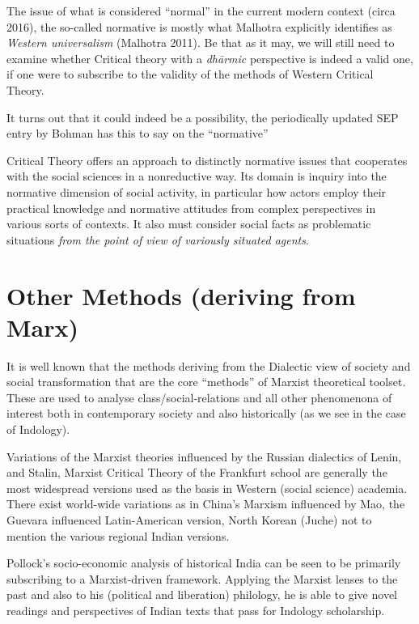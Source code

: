 The issue of what is considered ``normal'' in the current modern context (circa 2016), the so-called normative is mostly what Malhotra explicitly identifies as {\sl Western universalism} (Malhotra 2011). Be that as it may, we will still need to examine whether Critical theory with a {\sl dhārmic} perspective is indeed a valid one, if one were to subscribe to the validity of the methods of Western Critical Theory.

It turns out that it could indeed be a possibility, the periodically updated SEP entry by Bohman has this to say on the ``normative''
\begin{myquote}
Critical Theory offers an approach to distinctly normative issues that cooperates with the social sciences in a nonreductive way. Its domain is inquiry into the normative dimension of social activity, in particular how actors employ their practical knowledge and normative attitudes from complex perspectives in various sorts of contexts. It also must consider social facts as problematic situations {{\sl from the point of view of variously situated agents}\relax}.
\end{myquote}

\newpage

\section*{Other Methods (deriving from Marx)}

It is well known that the methods deriving  from the Dialectic view of society and social transformation that are the core ``methods'' of Marxist theoretical toolset. These are used to analyse class/social-relations and all other phenomenona of interest both in contemporary society and also historically (as we see in the case of Indology).

Variations of the Marxist theories influenced by the Russian dialectics of Lenin, and Stalin, Marxist Critical Theory of the Frankfurt school are generally the most widespread versions used as the basis in Western (social science) academia. There exist world-wide variations as in China's Marxism influenced by Mao, the Guevara influenced Latin-American version, North Korean (Juche) not to mention the various regional Indian versions.

Pollock's socio-economic analysis of historical India can be seen to be primarily subscribing to a Marxist-driven framework. Applying the Marxist lenses to the past and also to his (political and liberation) philology, he is able to give novel readings and perspectives of Indian texts that pass for Indology scholarship.

